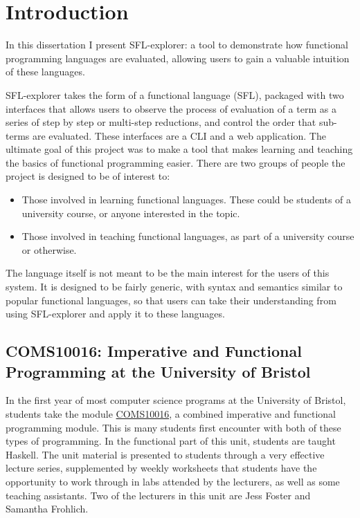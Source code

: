 \chapter{Introduction}
\label{chap:context}

In this dissertation I present SFL-explorer: a tool to demonstrate how functional programming languages are evaluated, allowing users to gain a valuable intuition of these languages. 

SFL-explorer takes the form of a functional language (\ac{SFL}), packaged with two interfaces that allows users to observe the process of evaluation of a term as a series of step by step or multi-step reductions, and control the order that sub-terms are evaluated. These interfaces are a \ac{CLI} and a web application. The ultimate goal of this project was to make a tool that makes learning and teaching the basics of functional programming easier. There are two groups of people the project is designed to be of interest to:
\begin{itemize}
    \item Those involved in learning functional languages. These could be students of a university course, or anyone interested in the topic. 
    \item Those involved in teaching functional languages, as part of a university course or otherwise.
\end{itemize}

The language itself is not meant to be the main interest for the users of this system. It is designed to be fairly generic, with syntax and semantics similar to popular functional languages, so that users can take their understanding from using SFL-explorer and apply it to these languages. 

\section{COMS10016: Imperative and Functional Programming at the University of Bristol}
\label{COMS10016}
In the first year of most computer science programs at the University of Bristol, students take the module \href{https://www.bristol.ac.uk/unit-programme-catalogue/UnitDetails.jsa?unitCode=COMS10016}{COMS10016}, a combined imperative and functional programming module. This is many students first encounter with both of these types of programming. In the functional part of this unit, students are taught Haskell. The unit material is presented to students through a very effective lecture series, supplemented by weekly worksheets that students have the opportunity to work through in labs attended by the lecturers, as well as some teaching assistants. Two of the lecturers in this unit are Jess Foster and Samantha Frohlich. 

